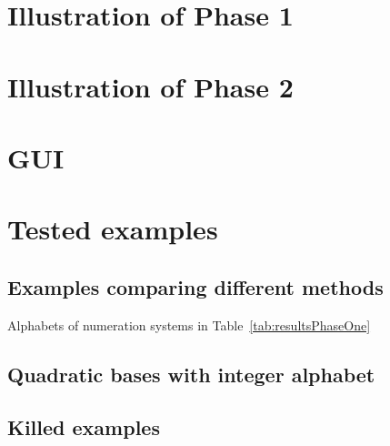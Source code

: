 \section{Illustration of Phase 1}
\section{Illustration of Phase 2}

\section{GUI}
\section{Tested examples}

\subsection*{Examples comparing different methods}

\begin{table}[h]
	\begin{center}
	
	\end{center}
\caption{Alphabets of numeration systems in Table~\ref{tab:resultsPhaseOne}}
\label{tab:alphabets}
\end{table}




%
%
\subsection*{Quadratic bases with integer alphabet}


\subsection*{Killed examples}
